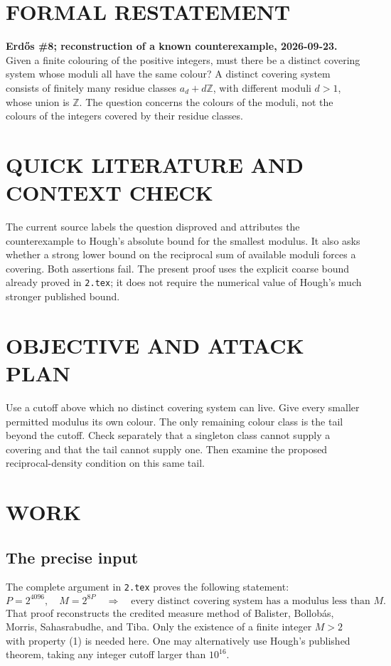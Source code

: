 \section{FORMAL RESTATEMENT}
\textbf{Erd\H{o}s \#8; reconstruction of a known counterexample, 2026-09-23.}
Given a finite colouring of the positive integers, must there be a distinct covering system whose moduli all have the same colour? A distinct covering system consists of finitely many residue classes $a_d+d\mathbb Z$, with different moduli $d>1$, whose union is $\mathbb Z$. The question concerns the colours of the moduli, not the colours of the integers covered by their residue classes.

\section{QUICK LITERATURE AND CONTEXT CHECK}
The current source labels the question disproved and attributes the counterexample to Hough's absolute bound for the smallest modulus. It also asks whether a strong lower bound on the reciprocal sum of available moduli forces a covering. Both assertions fail. The present proof uses the explicit coarse bound already proved in \texttt{2.tex}; it does not require the numerical value of Hough's much stronger published bound.

\section{OBJECTIVE AND ATTACK PLAN}
Use a cutoff above which no distinct covering system can live. Give every smaller permitted modulus its own colour. The only remaining colour class is the tail beyond the cutoff. Check separately that a singleton class cannot supply a covering and that the tail cannot supply one. Then examine the proposed reciprocal-density condition on this same tail.

\section{WORK}
\subsection{The precise input}
The complete argument in \texttt{2.tex} proves the following statement:
\[
 P=2^{4096},\quad M=2^{8P}\quad\Longrightarrow\quad
 \text{every distinct covering system has a modulus less than }M.
\tag{1}
\]
That proof reconstructs the credited measure method of Balister, Bollob\'as, Morris, Sahasrabudhe, and Tiba. Only the existence of a finite integer $M>2$ with property (1) is needed here. One may alternatively use Hough's published theorem, taking any integer cutoff larger than $10^{16}$.

